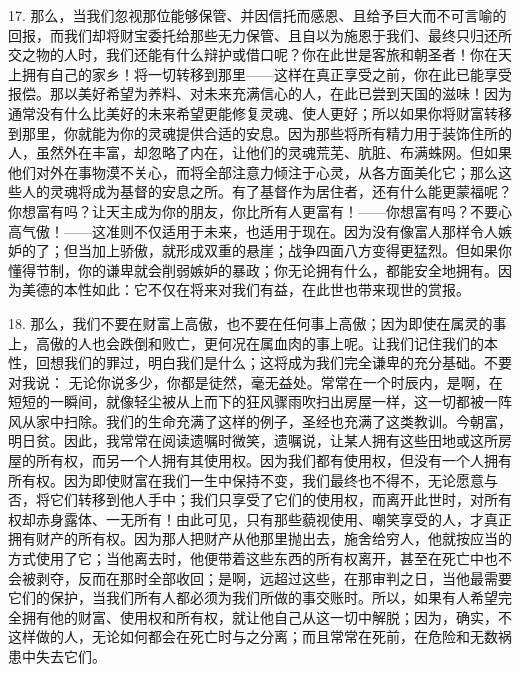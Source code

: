 17. 那么，当我们忽视那位能够保管、并因信托而感恩、且给予巨大而不可言喻的回报，而我们却将财宝委托给那些无力保管、且自以为施恩于我们、最终只归还所交之物的人时，我们还能有什么辩护或借口呢？你在此世是客旅和朝圣者！你在天上拥有自己的家乡！将一切转移到那里——这样在真正享受之前，你在此已能享受报偿。那以美好希望为养料、对未来充满信心的人，在此已尝到天国的滋味！因为通常没有什么比美好的未来希望更能修复灵魂、使人更好；所以如果你将财富转移到那里，你就能为你的灵魂提供合适的安息。因为那些将所有精力用于装饰住所的人，虽然外在丰富，却忽略了内在，让他们的灵魂荒芜、肮脏、布满蛛网。但如果他们对外在事物漠不关心，而将全部注意力倾注于心灵，从各方面美化它；那么这些人的灵魂将成为基督的安息之所。有了基督作为居住者，还有什么能更蒙福呢？你想富有吗？让天主成为你的朋友，你比所有人更富有！——你想富有吗？不要心高气傲！——这准则不仅适用于未来，也适用于现在。因为没有像富人那样令人嫉妒的了；但当加上骄傲，就形成双重的悬崖；战争四面八方变得更猛烈。但如果你懂得节制，你的谦卑就会削弱嫉妒的暴政；你无论拥有什么，都能安全地拥有。因为美德的本性如此：它不仅在将来对我们有益，在此世也带来现世的赏报。\par

18. 那么，我们不要在财富上高傲，也不要在任何事上高傲；因为即使在属灵的事上，高傲的人也会跌倒和败亡，更何况在属血肉的事上呢。让我们记住我们的本性，回想我们的罪过，明白我们是什么；这将成为我们完全谦卑的充分基础。不要对我说： 无论你说多少，你都是徒然，毫无益处。常常在一个时辰内，是啊，在短短的一瞬间，就像轻尘被从上而下的狂风骤雨吹扫出房屋一样，这一切都被一阵风从家中扫除。我们的生命充满了这样的例子，圣经也充满了这类教训。今朝富，明日贫。因此，我常常在阅读遗嘱时微笑，遗嘱说，让某人拥有这些田地或这所房屋的所有权，而另一个人拥有其使用权。因为我们都有使用权，但没有一个人拥有所有权。因为即使财富在我们一生中保持不变，我们最终也不得不，无论愿意与否，将它们转移到他人手中；我们只享受了它们的使用权，而离开此世时，对所有权却赤身露体、一无所有！由此可见，只有那些藐视使用、嘲笑享受的人，才真正拥有财产的所有权。因为那人把财产从他那里抛出去，施舍给穷人，他就按应当的方式使用了它；当他离去时，他便带着这些东西的所有权离开，甚至在死亡中也不会被剥夺，反而在那时全部收回；是啊，远超过这些，在那审判之日，当他最需要它们的保护，当我们所有人都必须为我们所做的事交账时。所以，如果有人希望完全拥有他的财富、使用权和所有权，就让他自己从这一切中解脱；因为，确实，不这样做的人，无论如何都会在死亡时与之分离；而且常常在死前，在危险和无数祸患中失去它们。\par

